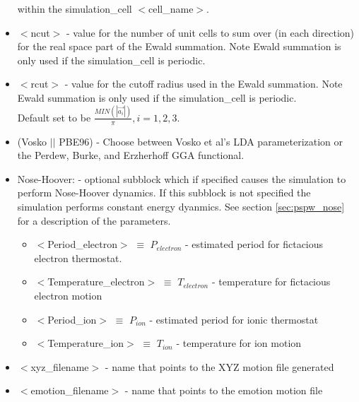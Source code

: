 \begin{itemize}
                           within the simulation\_cell $<$cell\_name$>$.
        \item $<$ncut$>$ - value for the number of unit cells
                          to sum over (in each direction) for the real space
                          part of the Ewald summation. Note Ewald summation
                          is only used if the simulation\_cell is periodic.
        \item $<$rcut$>$ - value for the cutoff radius used
                          in the Ewald summation.  Note Ewald summation
                          is only used if the simulation\_cell is periodic. \\
                          Default set to be
                          $\frac{MIN(\left| \vec{a_i} \right|)}{\pi}, i=1,2,3$.
        \item (Vosko $||$ PBE96) - Choose between Vosko et al's LDA 
                               parameterization or the Perdew, Burke, 
                               and Erzherhoff GGA functional.
        \item Nose-Hoover: - optional subblock which if specified
                         causes the simulation to perform Nose-Hoover dynamics.
                         If this subblock is not specified the 
                         simulation performs constant energy dyanmics.
                         See section \ref{sec:pspw_nose} for a description of the parameters.
                         \begin{itemize}
                             \item $<$Period\_electron$>$ $\equiv$ $P_{electron}$ 
                                    - estimated period for fictacious electron thermostat.
                             \item $<$Temperature\_electron$>$ $\equiv$ $T_{electron}$ 
                                    - temperature for fictacious electron motion
                             \item $<$Period\_ion$>$ $\equiv$ $P_{ion}$ 
                                    - estimated period for ionic thermostat
                             \item $<$Temperature\_ion$>$ $\equiv$ $T_{ion}$ 
                                    - temperature for ion motion
                         \end{itemize}
        \item $<$xyz\_filename$>$ - name that points to the XYZ motion file
                                generated
        \item $<$emotion\_filename$>$ - name that points to the emotion motion file

\end{itemize}
